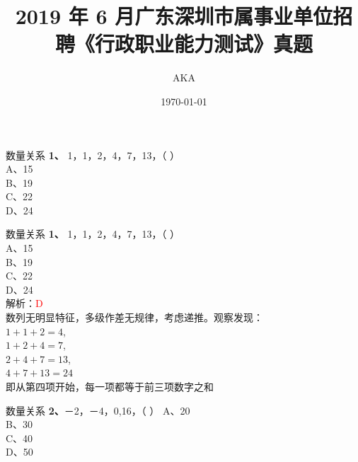 \documentclass[aspectratio=169]{beamer}
\begin{document}
%
%

\title{2019 年 6 月广东深圳市属事业单位招聘《行政职业能力测试》真题}
\author{AKA}
\date{\today}

\begin{frame}
    \titlepage
\end{frame}


\begin{frame}[t]{数量关系}
    \textbf{1、}
    1，1，2，4，7，13，（ ）\\
    A、15\\
    B、19\\
    C、22\\
    D、24\\
\end{frame}

\begin{frame}[t]{数量关系}
    \textbf{1、}
    1，1，2，4，7，13，（ ）\\
    A、15\\
    B、19\\
    C、22\\
    D、24\\
    解析：\textcolor{red}{D}\\
    数列无明显特征，多级作差无规律，考虑递推。观察发现：\\
    $1+1+2=4$,\\
    $1+2+4=7$,\\
    $2+4+7=13$,\\
    $4+7+13=24$\\
    即从第四项开始，每一项都等于前三项数字之和\\
\end{frame}


\begin{frame}[t]{数量关系}
    \textbf{2、}－2，－4，0,16，（ ）
    A、20\\
    B、30\\
    C、40\\
    D、50\\
\end{frame}
\end{document}
